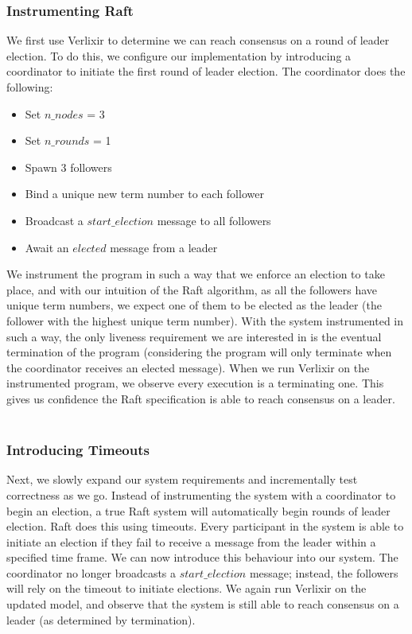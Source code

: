 \subsubsection{Instrumenting Raft}
We first use Verlixir to determine we can reach consensus on a round of leader election. To do this, we configure our implementation by introducing a coordinator to initiate the first round of leader election. The coordinator does the following:
\begin{itemize}
    \item Set $n\_nodes$ = 3
    \item Set $n\_rounds$ = 1
    \item Spawn 3 followers
    \item Bind a unique new term number to each follower
    \item Broadcast a $start\_election$ message to all followers
    \item Await an $elected$ message from a leader
\end{itemize} 
We instrument the program in such a way that we enforce an election to take place, and with our intuition of the Raft algorithm, as all the followers have unique term numbers, we expect one of them to be elected as the leader (the follower with the highest unique term number). With the system instrumented in such a way, the only liveness requirement we are interested in is the eventual termination of the program (considering the program will only terminate when the coordinator receives an elected message). When we run Verlixir on the instrumented program, we observe every execution is a terminating one. This gives us confidence the Raft specification is able to reach consensus on a leader.
\\ \\
\subsubsection{Introducing Timeouts}
Next, we slowly expand our system requirements and incrementally test correctness as we go. Instead of instrumenting the system with a coordinator to begin an election, a true Raft system will automatically begin rounds of leader election. Raft does this using timeouts. Every participant in the system is able to initiate an election if they fail to receive a message from the leader within a specified time frame. We can now introduce this behaviour into our system. The coordinator no longer broadcasts a $start\_election$ message; instead, the followers will rely on the timeout to initiate elections. We again run Verlixir on the updated model, and observe that the system is still able to reach consensus on a leader (as determined by termination).
\\ \\
